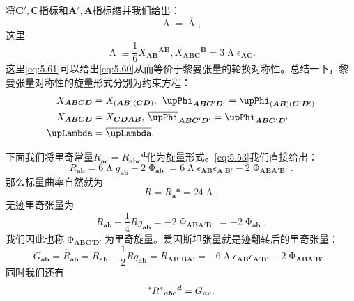 将$\boldsymbol{C} ',\boldsymbol{C}$指标和$\boldsymbol{A} ',\boldsymbol{A}$指标缩并我们给出：
\begin{equation}
	\upLambda =\overline{\upLambda } ,
	\label{eq:5.61}
\end{equation}
这里
\begin{equation*}
	\upLambda \equiv \frac{1}{6} X{_{\boldsymbol{AB}}}^{\boldsymbol{AB}} ,X{_{\boldsymbol{ABC}}}^{\boldsymbol{B}} =3\upLambda \epsilon _{\boldsymbol{AC}} .
\end{equation*}
这里\ref{eq:5.61}可以给出\ref{eq:5.60}从而等价于黎曼张量的轮换对称性。总结一下，黎曼张量对称性的旋量形式分别为约束方程：
\begin{equation*}
	\begin{aligned}
		X_{\boldsymbol{ABCD}} & =X_{(\boldsymbol{AB})(\boldsymbol{CD})} ,\kern+0.4em \upPhi _{\boldsymbol{ABC} '\boldsymbol{D} '} =\upPhi _{(\boldsymbol{AB})(\boldsymbol{C} '\boldsymbol{D} ')}\\
		X_{\boldsymbol{ABCD}} & =X_{\boldsymbol{CDAB}} ,\thinspace \overline{\upPhi }_{\boldsymbol{ABC} '\boldsymbol{D} '} =\upPhi _{\boldsymbol{ABC} '\boldsymbol{D} '}\\
		\upLambda  & =\overline{\upLambda } .
	\end{aligned}
\end{equation*}


下面我们将里奇常量$R_{\boldsymbol{ac}} =R{_{\boldsymbol{abc}}}^{\boldsymbol{d}}$化为旋量形式。\ref{eq:5.53}我们直接给出：
\begin{equation}
	R_{\boldsymbol{ab}} =6\upLambda g_{\boldsymbol{ab}} -2\upPhi _{\boldsymbol{ab}} =6\upLambda \epsilon _{\boldsymbol{AB}} \epsilon _{\boldsymbol{A} '\boldsymbol{B} '} -2\upPhi _{\boldsymbol{ABA} '\boldsymbol{B} '} .
	\label{eq:5.62}
\end{equation}
那么标量曲率自然就为
\begin{equation*}
	R=R{_{\boldsymbol{a}}}^{\boldsymbol{a}} =24\upLambda .
\end{equation*}
无迹里奇张量为
\begin{equation*}
	R_{\boldsymbol{ab}} -\frac{1}{4} Rg_{\boldsymbol{ab}} =-2\upPhi _{\boldsymbol{ABA} '\boldsymbol{B} '} =-2\upPhi _{\boldsymbol{ab}} .
\end{equation*}
我们因此也称$\upPhi _{\boldsymbol{ABC'D} '}$为里奇旋量。爱因斯坦张量就是迹翻转后的里奇张量：
\begin{equation}
	G_{\boldsymbol{ab}} =\hat{R}_{\boldsymbol{ab}} =R_{\boldsymbol{ab}} -\frac{1}{2} Rg_{\boldsymbol{ab}} =R_{\boldsymbol{AB} '\boldsymbol{BA} '} =-6\upLambda \epsilon _{\boldsymbol{AB}} \epsilon _{\boldsymbol{A} '\boldsymbol{B} '} -2\upPhi _{\boldsymbol{ABA} '\boldsymbol{B} '} .
	\label{eq:5.63}
\end{equation}
同时我们还有
\begin{equation*}
	\prescript{*}{}{} R^{*}{}{_{\boldsymbol{abc}}}^{\boldsymbol{d}} =G_{\boldsymbol{ac}} .
\end{equation*}

